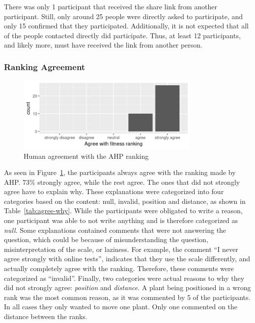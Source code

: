 There was only 1 participant that received the share link from another participant.
Still, only around 25 people were directly asked to participate, and only 15 confirmed that they participated.
Additionally, it is not expected that all of the people contacted directly did participate.
Thus, at least 12 participants, and likely more, must have received the link from another person.

\subsubsection{Ranking Agreement}
\begin{figure}
    \centering
    \includegraphics[width=0.8\textwidth]{figures/agree}
    \caption{Human agreement with the AHP ranking}
    \label{fig:agree}
\end{figure}

As seen in Figure~\ref{fig:agree}, the participants always agree with the ranking made by \gls{AHP}.
73\% strongly agree, while the rest agree.
The ones that did not strongly agree have to explain why.
These explanations were categorized into four categories based on the content: null, invalid, position and distance, as shown in Table~\ref{tab:agree-why}.
While the participants were obligated to write a reason, one participant was able to not write anything and is therefore categorized as \textit{null}.
Some explanations contained comments that were not answering the question, which could be because of misunderstanding the question, misinterpretation of the scale, or laziness.
For example, the comment ``I never agree strongly with online tests'', indicates that they use the scale differently, and actually completely agree with the ranking.
Therefore, these comments were categorized as ``invalid''.
Finally, two categories were actual reasons to why they did not strongly agree: \textit{position} and \textit{distance}.
A plant being positioned in a wrong rank was the most common reason, as it was commented by 5 of the participants.
In all cases they only wanted to move one plant.
Only one commented on the distance between the ranks.

